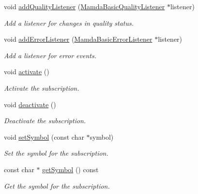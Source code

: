 \begin{CompactItemize}
void \hyperlink{classWombat_1_1MamdaBasicSubscription_2144d4ffbedc27f3977fb6d3f3b22177}{add\-Quality\-Listener} (\hyperlink{classWombat_1_1MamdaBasicQualityListener}{Mamda\-Basic\-Quality\-Listener} $\ast$listener)
\begin{CompactList}\small\item\em Add a listener for changes in quality status. \item\end{CompactList}\item 
void \hyperlink{classWombat_1_1MamdaBasicSubscription_603860e2a70d52d81b58c1144d917134}{add\-Error\-Listener} (\hyperlink{classWombat_1_1MamdaBasicErrorListener}{Mamda\-Basic\-Error\-Listener} $\ast$listener)
\begin{CompactList}\small\item\em Add a listener for error events. \item\end{CompactList}\item 
void \hyperlink{classWombat_1_1MamdaBasicSubscription_704ba0b8ec4c027d0357d3e482314605}{activate} ()
\begin{CompactList}\small\item\em Activate the subscription. \item\end{CompactList}\item 
void \hyperlink{classWombat_1_1MamdaBasicSubscription_08fea356e431659a445fa51f1771e915}{deactivate} ()
\begin{CompactList}\small\item\em Deactivate the subscription. \item\end{CompactList}\item 
void \hyperlink{classWombat_1_1MamdaBasicSubscription_bf05607bd5df80605cac565166196723}{set\-Symbol} (const char $\ast$symbol)
\begin{CompactList}\small\item\em Set the symbol for the subscription. \item\end{CompactList}\item 
const char $\ast$ \hyperlink{classWombat_1_1MamdaBasicSubscription_70c8ddc491827feafae615113552ae0e}{get\-Symbol} () const 
\begin{CompactList}\small\item\em Get the symbol for the subscription. \item\end{CompactList}\item 

\end{CompactItemize}
